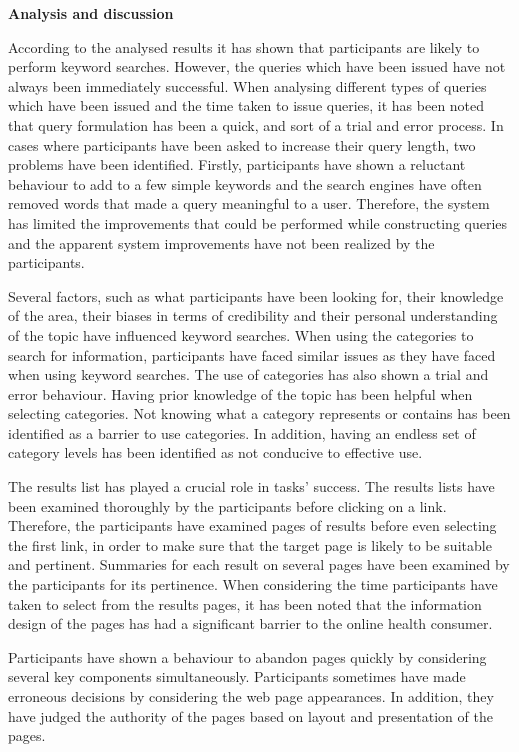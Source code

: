 \documentclass[]{article}
\begin{document}
\textbf{Analysis and discussion} 

According to the analysed results it has shown that participants are likely to perform keyword searches. However, the queries which have been issued have not always been immediately successful. When analysing different types of queries which have been issued and the time taken to issue queries, it has been noted that query formulation has been a quick, and sort of a trial and error process. In cases where participants have been asked to increase their query length, two problems have been identified. Firstly, participants have shown a reluctant behaviour to add to a few simple keywords and the search engines have often removed words that made a query meaningful to a user. Therefore, the system has limited the improvements that could be performed while constructing queries and the apparent system improvements have not been realized by the participants.        

Several factors, such as what participants have been looking for, their knowledge of the area, their biases in terms of credibility and their personal understanding of the topic have influenced keyword searches. When using the categories to search for information, participants have faced similar issues as they have faced when using keyword searches. The use of categories has also shown a trial and error behaviour. Having prior knowledge of the topic has been helpful when selecting categories. Not knowing what a category represents or contains has been identified as a barrier to use categories. In addition, having an endless set of category levels has been identified as not conducive to effective use. 

The results list has played a crucial role in tasks’ success. The results lists have been examined thoroughly by the participants before clicking on a link. Therefore, the participants have examined pages of results before even selecting the first link, in order to make sure that the target page is likely to be suitable and pertinent. Summaries for each result on several pages have been examined by the participants for its pertinence. When considering the time participants have taken to select from the results pages, it has been noted that the information design of the pages has had a significant barrier to the online health consumer.      

Participants have shown a behaviour to abandon pages quickly by considering several key components simultaneously. Participants sometimes have made erroneous decisions by considering the web page appearances. In addition, they have judged the authority of the pages based on layout and presentation of the pages.        
\end{document}
